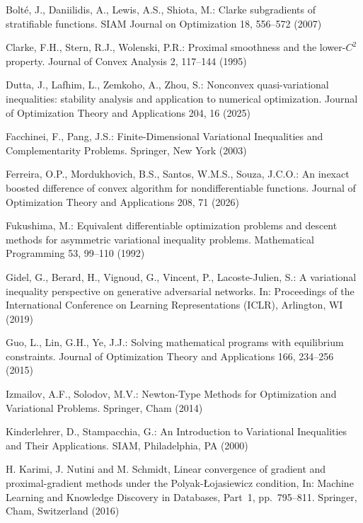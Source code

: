 \documentclass[11pt,a4paper]{article}
\theoremstyle{plain}
\begin{document}
\begin{thebibliography}{}
Bolt\'e, J., Daniilidis, A., Lewis, A.S., Shiota, M.: 
Clarke subgradients of stratifiable functions. 
SIAM Journal on Optimization 18, 556--572 (2007)

Clarke, F.H., Stern, R.J., Wolenski, P.R.: 
Proximal smoothness and the lower-$C^2$ property. 
Journal of Convex Analysis 2, 117--144 (1995)

Dutta, J., Lafhim, L., Zemkoho, A., Zhou, S.:
Nonconvex quasi-variational inequalities: stability analysis and application to numerical optimization.
Journal of Optimization Theory and Applications 204, 16 (2025)

Facchinei, F., Pang, J.S.: 
Finite-Dimensional Variational Inequalities and Complementarity Problems. 
Springer, New York (2003)

  Ferreira, O.P., Mordukhovich, B.S., Santos, W.M.S., Souza, J.C.O.: 
An inexact boosted difference of convex algorithm for nondifferentiable functions. 
Journal of Optimization Theory and Applications 208, 71 (2026)


Fukushima, M.: 
Equivalent differentiable optimization problems and descent methods for asymmetric variational inequality problems. 
Mathematical Programming 53, 99--110 (1992)

Gidel, G., Berard, H., Vignoud, G., Vincent, P., Lacoste-Julien, S.: 
A variational inequality perspective on generative adversarial networks. 
In: Proceedings of the International Conference on Learning Representations (ICLR), Arlington, WI (2019)

Guo, L., Lin, G.H., Ye, J.J.: 
Solving mathematical programs with equilibrium constraints. 
Journal of Optimization Theory and Applications 166, 234--256 (2015)



Izmailov, A.F., Solodov, M.V.: 
Newton-Type Methods for Optimization and Variational Problems. 
Springer, Cham (2014)

Kinderlehrer, D., Stampacchia, G.: 
An Introduction to Variational Inequalities and Their Applications. 
SIAM, Philadelphia, PA (2000)



 H. Karimi, J. Nutini and M. Schmidt, Linear convergence of gradient and proximal-gradient methods under the Polyak-\L ojasiewicz condition, In: Machine Learning and Knowledge Discovery in Databases, Part~1, pp.\ 
795--811. Springer, Cham, Switzerland (2016)


\end{thebibliography}
\end{document}
